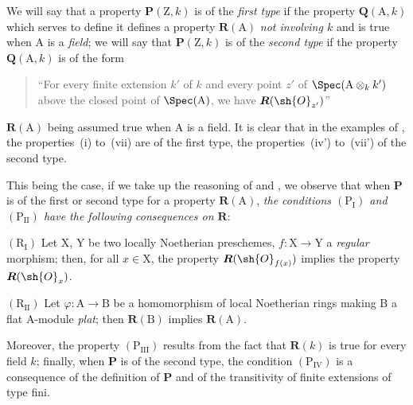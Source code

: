 \begin{env}[7.3.10]
\label{IV.7.3.10}
We will say that a property $\boldsymbol{P}(\mathrm{Z},k)$ is of the \emph{first type} if the property $\boldsymbol{Q}(\mathrm{A},k)$ which serves to define it defines a property $\boldsymbol{R}(\mathrm{A})$ \emph{not involving $k$} and is true when $\mathrm{A}$ is a \emph{field}; we will say that $\boldsymbol{P}(\mathrm{Z},k)$ is of the \emph{second type} if the property $\boldsymbol{Q}(\mathrm{A},k)$ is of the form
\begin{quote}
``For every finite extension $k'$ of $k$ and every point $z'$ of $\Spec(\mathrm{A}\otimes_k k')$ above the closed point of $\Spec(\mathrm{A})$, we have $\boldsymbol{R}(\sh{O}_{z'})$''
\end{quote}
$\boldsymbol{R}(\mathrm{A})$ being assumed true when $\mathrm{A}$ is a field.
It is clear that in the examples of , the properties~(i) to~(vii) are of the first type, the properties~(iv') to~(vii') of the second type.

This being the case, if we take up the reasoning of  and , we observe that when $\boldsymbol{P}$ is of the first or second type for a property $\boldsymbol{R}(\mathrm{A})$, \emph{the conditions $(\mathrm{P_I})$ and $(\mathrm{P_{II}})$ have the following consequences on $\boldsymbol{R}$}:

$(\mathrm{R_I})$ Let $\mathrm{X}$, $\mathrm{Y}$ be two locally Noetherian preschemes, $f:\mathrm{X}\to\mathrm{Y}$ a \emph{regular} morphism; then, for all $x\in\mathrm{X}$, the property $\boldsymbol{R}(\sh{O}_{f(x)})$ implies the property $\boldsymbol{R}(\sh{O}_x)$.

$(\mathrm{R_{II}})$ Let $\varphi:\mathrm{A}\to\mathrm{B}$ be a homomorphism of local Noetherian rings making $\mathrm{B}$ a flat $\mathrm{A}$-module \emph{plat}; then $\boldsymbol{R}(\mathrm{B})$ implies $\boldsymbol{R}(\mathrm{A})$.

Moreover, the property $(\mathrm{P_{III}})$ results from the fact that $\boldsymbol{R}(k)$ is true for every field $k$; finally, when $\boldsymbol{P}$ is of the second type, the condition $(\mathrm{P_{IV}})$ is a consequence of the definition of $\boldsymbol{P}$ and of the transitivity of finite extensions of type fini.
\end{env}

